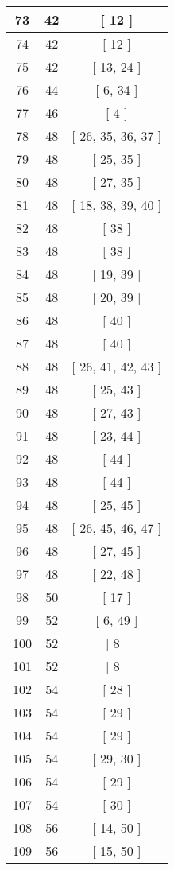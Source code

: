 \begin{center}
\begin{longtable}[H]{|| c c c ||}
\hline
73 & 42 & [ 12 ] \\ 
\hline
74 & 42 & [ 12 ] \\ 
\hline
75 & 42 & [ 13, 24 ] \\ 
\hline
76 & 44 & [ 6, 34 ] \\ 
\hline
77 & 46 & [ 4 ] \\ 
\hline
78 & 48 & [ 26, 35, 36, 37 ] \\ 
\hline
79 & 48 & [ 25, 35 ] \\ 
\hline
80 & 48 & [ 27, 35 ] \\ 
\hline
81 & 48 & [ 18, 38, 39, 40 ] \\ 
\hline
82 & 48 & [ 38 ] \\ 
\hline
83 & 48 & [ 38 ] \\ 
\hline
84 & 48 & [ 19, 39 ] \\ 
\hline
85 & 48 & [ 20, 39 ] \\ 
\hline
86 & 48 & [ 40 ] \\ 
\hline
87 & 48 & [ 40 ] \\ 
\hline
88 & 48 & [ 26, 41, 42, 43 ] \\ 
\hline
89 & 48 & [ 25, 43 ] \\ 
\hline
90 & 48 & [ 27, 43 ] \\ 
\hline
91 & 48 & [ 23, 44 ] \\ 
\hline
92 & 48 & [ 44 ] \\ 
\hline
93 & 48 & [ 44 ] \\ 
\hline
94 & 48 & [ 25, 45 ] \\ 
\hline
95 & 48 & [ 26, 45, 46, 47 ] \\ 
\hline
96 & 48 & [ 27, 45 ] \\ 
\hline
97 & 48 & [ 22, 48 ] \\ 
\hline
98 & 50 & [ 17 ] \\ 
\hline
99 & 52 & [ 6, 49 ] \\ 
\hline
100 & 52 & [ 8 ] \\ 
\hline
101 & 52 & [ 8 ] \\ 
\hline
102 & 54 & [ 28 ] \\ 
\hline
103 & 54 & [ 29 ] \\ 
\hline
104 & 54 & [ 29 ] \\ 
\hline
105 & 54 & [ 29, 30 ] \\ 
\hline
106 & 54 & [ 29 ] \\ 
\hline
107 & 54 & [ 30 ] \\ 
\hline
108 & 56 & [ 14, 50 ] \\ 
\hline
109 & 56 & [ 15, 50 ] \\ 

\end{longtable}
\end{center}
